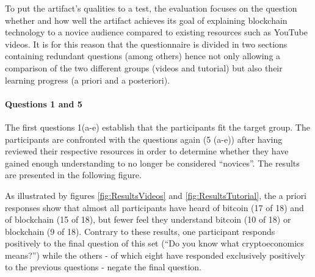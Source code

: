 To put the artifact's qualities to a test, the evaluation focuses on the question whether and how well the artifact achieves its goal of explaining blockchain technology to a novice audience compared to existing resources such as YouTube videos. It is for this reason that the questionnaire is divided in two sections containing redundant questions (among others) hence not only allowing a comparison of the two different groups (videos and tutorial) but also their learning progress (a priori and a posteriori).

\paragraph{Questions 1 and 5}The first questions 1(a-e) establish that the participants fit the target group. The participants are confronted with the questions again (5 (a-e)) after having reviewed their respective resources in order to determine whether they have gained enough understanding to no longer be considered \enquote{novices}. The results are presented in the following figure. 

As illustrated by figures \ref{fig:ResultsVideos} and \ref{fig:ResultsTutorial}, the a priori responses show that almost all participants have heard of bitcoin (17 of 18) and of blockchain (15 of 18), but fewer feel they understand bitcoin (10 of 18) or blockchain (9 of 18). Contrary to these results, one participant responds positively to the final question of this set (\enquote{Do you know what cryptoeconomics means?}) while the others - of which eight have responded exclusively positively to the previous questions - negate the final question.

